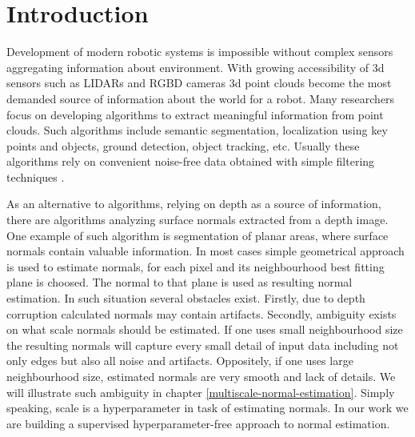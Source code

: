 \chapter{Introduction}

Development of modern robotic systems is impossible without complex sensors aggregating information about environment. With growing accessibility of 3d sensors such as LIDARs and RGBD cameras 3d point clouds become the most demanded source of information about the world for a robot. Many researchers focus on developing algorithms to extract meaningful information from point clouds. Such algorithms include semantic segmentation, localization using key points and objects, ground detection, object tracking, etc. Usually these algorithms rely on convenient noise-free data obtained with simple filtering techniques \cite{dense_planar_slam}.

As an alternative to algorithms, relying on depth as a source of information, there are algorithms analyzing surface normals extracted from a depth image. One example of such algorithm is segmentation of planar areas, where surface normals contain valuable information. In most cases simple geometrical approach is used to estimate normals, for each pixel and its neighbourhood best fitting plane is choosed. The normal to that plane is used as resulting normal estimation.  In such situation several obstacles exist. Firstly, due to depth corruption calculated normals may contain artifacts. Secondly, ambiguity exists on what scale normals should be estimated. If one uses small neighbourhood size the resulting normals will capture every small detail of input data including not only edges but also all noise and artifacts. Oppositely, if one uses large neighbourhood size, estimated normals are very smooth and lack of details. We will illustrate such ambiguity in chapter \ref{multiscale-normal-estimation}. Simply speaking, scale is a hyperparameter in task of estimating normals. In our work we are building a supervised hyperparameter-free approach to normal estimation.


